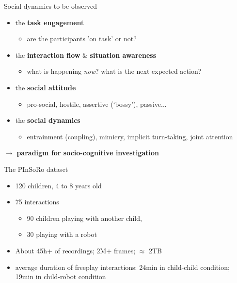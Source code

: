 \documentclass[xcolor=table]{beamer}
\begin{document}
\begin{frame}{Social dynamics to be observed}

    \begin{itemize}
        \item<+-> the \textbf{task engagement}
            \begin{itemize}
                \item are the participants 'on task' or not?
            \end{itemize}
        \item<+-> the \textbf{interaction flow} \& \textbf{situation awareness}
            \begin{itemize}
                \item what is happening \emph{now}? what is the next expected
                    action?
            \end{itemize}
        \item<+-> the \textbf{social attitude}
            \begin{itemize}
                \item pro-social, hostile, assertive (‘bossy’), passive...
            \end{itemize}
        \item<+-> the \textbf{social dynamics}
            \begin{itemize}
                \item entrainment (coupling), mimicry, implicit turn-taking, joint
                    attention
            \end{itemize}
    \end{itemize}

    \pause
    $\rightarrow$ {\bf paradigm for socio-cognitive investigation}
\end{frame}




{
\begin{frame}{The PInSoRo dataset}
    \begin{itemize}
        \item 120 children, 4 to 8 years old
        \item 75 interactions
            \begin{itemize}
                \item 90 children playing with another child, 
                \item 30 playing with a robot
            \end{itemize}
        \item About 45h+ of recordings; 2M+ frames; $\approx$ 2TB
         \item average duration of freeplay interactions: 24min in child-child
         condition; 19min in child-robot condition
    \end{itemize}

\end{frame}
}
\end{document}
